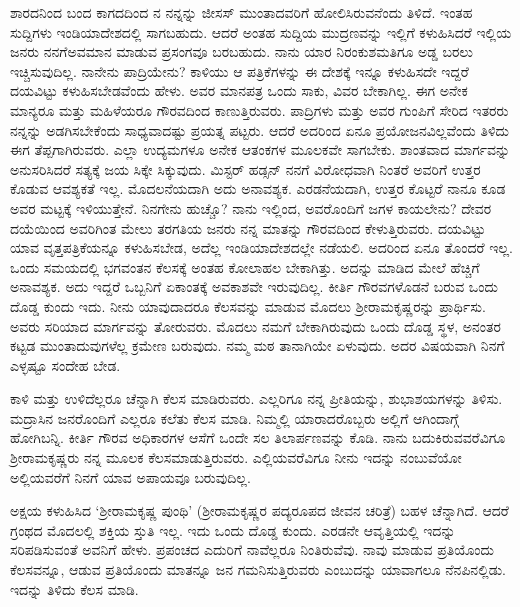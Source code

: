 ಶಾರದನಿಂದ ಬಂದ ಕಾಗದದಿಂದ ನ\enginline{-} ನನ್ನನ್ನು ಜೀಸಸ್ ಮುಂತಾದವರಿಗೆ ಹೋಲಿಸಿರುವನೆಂದು ತಿಳಿದೆ. ಇಂತಹ ಸುದ್ದಿಗಳು ಇಂಡಿಯಾದೇಶದಲ್ಲಿ ಸಾಗಬಹುದು. ಆದರೆ ಅಂತಹ ಸುದ್ದಿಯ ಮುದ್ರಣವನ್ನು ಇಲ್ಲಿಗೆ ಕಳುಹಿಸಿದರೆ ಇಲ್ಲಿಯ ಜನರು ನನಗೆ\break ಅವಮಾನ ಮಾಡುವ ಪ್ರಸಂಗವೂ ಬರಬಹುದು. ನಾನು ಯಾರ ನಿರಂಕುಶಮತಿಗೂ ಅಡ್ಡ ಬರಲು ಇಚ್ಚಿಸುವುದಿಲ್ಲ. ನಾನೇನು ಪಾದ್ರಿಯೇನು? ಕಾಳಿಯು ಆ ಪತ್ರಿಕೆಗಳನ್ನು ಈ ದೇಶಕ್ಕೆ ಇನ್ನೂ ಕಳುಹಿಸದೇ ಇದ್ದರೆ ದಯವಿಟ್ಟು ಕಳುಹಿಸಬೇಡವೆಂದು ಹೇಳು. ಅವರ ಮಾನಪತ್ರ ಒಂದು ಸಾಕು, ವಿವರ ಬೇಕಾಗಿಲ್ಲ. ಈಗ ಅನೇಕ ಮಾನ್ಯರೂ ಮತ್ತು ಮಹಿಳೆಯರೂ ಗೌರವದಿಂದ ಕಾಣುತ್ತಿರುವರು. ಪಾದ್ರಿಗಳು ಮತ್ತು ಅವರ ಗುಂಪಿಗೆ ಸೇರಿದ ಇತರರು ನನ್ನನ್ನು ಅಡಗಿಸಬೇಕೆಂದು ಸಾಧ್ಯವಾದಷ್ಟು ಪ್ರಯತ್ನ ಪಟ್ಟರು. ಆದರೆ ಅದರಿಂದ ಏನೂ ಪ್ರಯೋಜನವಿಲ್ಲವೆಂದು ತಿಳಿದು ಈಗ ತೆಪ್ಪಗಾಗಿರುವರು. ಎಲ್ಲಾ ಉದ್ಯಮಗಳೂ ಅನೇಕ ಆತಂಕಗಳ ಮೂಲಕವೇ ಸಾಗಬೇಕು. ಶಾಂತವಾದ ಮಾರ್ಗವನ್ನು ಅನುಸರಿಸಿದರೆ ಸತ್ಯಕ್ಕೆ ಜಯ ಸಿಕ್ಕೇ ಸಿಕ್ಕುವುದು. ಮಿಸ್ಟರ್ ಹಡ್ಸನ್ ನನಗೆ ವಿರೋಧವಾಗಿ ನಿಂತರೆ ಅವರಿಗೆ ಉತ್ತರ ಕೊಡುವ ಆವಶ್ಯಕತೆ ಇಲ್ಲ. ಮೊದಲನೆಯದಾಗಿ ಅದು ಅನಾವಶ್ಯಕ. ಎರಡನೆಯದಾಗಿ, ಉತ್ತರ ಕೊಟ್ಟರೆ ನಾನೂ ಕೂಡ ಅವರ ಮಟ್ಟಕ್ಕೆ ಇಳಿಯುತ್ತೇನೆ. ನಿನಗೇನು ಹುಚ್ಚೊ? ನಾನು ಇಲ್ಲಿಂದ, ಅವರೊಂದಿಗೆ ಜಗಳ ಕಾಯಲೇನು? ದೇವರ ದಯೆಯಿಂದ ಅವರಿಗಿಂತ ಮೇಲು ತರಗತಿಯ ಜನರು ನನ್ನ ಮಾತನ್ನು ಗೌರವದಿಂದ ಕೇಳುತ್ತಿರುವರು. ದಯವಿಟ್ಟು ಯಾವ ವೃತ್ತಪತ್ರಿಕೆಯನ್ನೂ ಕಳುಹಿಸಬೇಡ, ಅದೆಲ್ಲ ಇಂಡಿಯಾದೇಶದಲ್ಲೇ ನಡೆಯಲಿ. ಅದರಿಂದ ಏನೂ ತೊಂದರೆ ಇಲ್ಲ. ಒಂದು ಸಮಯದಲ್ಲಿ ಭಗವಂತನ ಕೆಲಸಕ್ಕೆ ಅಂತಹ ಕೋಲಾಹಲ ಬೇಕಾಗಿತ್ತು. ಅದನ್ನು ಮಾಡಿದ ಮೇಲೆ ಹೆಚ್ಚಿಗೆ ಅನಾವಶ್ಯಕ. ಅದು ಇದ್ದರೆ ಒಬ್ಬನಿಗೆ ಏಕಾಂತಕ್ಕೆ ಅವಕಾಶವೇ ಇರುವುದಿಲ್ಲ. ಕೀರ್ತಿ ಗೌರವಗಳೊಡನೆ ಬರುವ ಒಂದು ದೊಡ್ಡ ಕುಂದು ಇದು. ನೀನು ಯಾವುದಾದರೂ ಕೆಲಸವನ್ನು ಮಾಡುವ ಮೊದಲು ಶ‍್ರೀರಾಮಕೃಷ್ಣರನ್ನು ಪ್ರಾರ್ಥಿಸು. ಅವರು ಸರಿಯಾದ ಮಾರ್ಗವನ್ನು ತೋರುವರು. ಮೊದಲು ನಮಗೆ ಬೇಕಾಗಿರುವುದು ಒಂದು ದೊಡ್ಡ ಸ್ಥಳ, ಅನಂತರ ಕಟ್ಟಡ ಮುಂತಾದುವುಗಳೆಲ್ಲ ಕ್ರಮೇಣ ಬರುವುದು. ನಮ್ಮ ಮಠ ತಾನಾಗಿಯೇ ಏಳುವುದು. ಅದರ ವಿಷಯವಾಗಿ ನಿನಗೆ ಎಳ್ಳಷ್ಟೂ ಸಂದೇಹ ಬೇಡ.

\vspace{0.1cm}

ಕಾಳಿ ಮತ್ತು ಉಳಿದೆಲ್ಲರೂ ಚೆನ್ನಾಗಿ ಕೆಲಸ ಮಾಡಿರುವರು. ಎಲ್ಲರಿಗೂ ನನ್ನ ಪ್ರೀತಿಯನ್ನು, ಶುಭಾಶಯಗಳನ್ನು ತಿಳಿಸು. ಮದ್ರಾಸಿನ ಜನರೊಂದಿಗೆ ಎಲ್ಲರೂ ಕಲೆತು ಕೆಲಸ ಮಾಡಿ. ನಿಮ್ಮಲ್ಲಿ ಯಾರಾದರೊಬ್ಬರು ಅಲ್ಲಿಗೆ ಆಗಿಂದಾಗ್ಗೆ ಹೋಗಿಬನ್ನಿ. ಕೀರ್ತಿ ಗೌರವ ಅಧಿಕಾರಗಳ ಆಸೆಗೆ ಒಂದೇ ಸಲ ತಿಲಾರ್ಪಣವನ್ನು ಕೊಡಿ. ನಾನು ಬದುಕಿರುವವರೆವಿಗೂ ಶ‍್ರೀರಾಮಕೃಷ್ಣರು ನನ್ನ ಮೂಲಕ ಕೆಲಸಮಾಡುತ್ತಿರುವರು. ಎಲ್ಲಿಯವರೆವಿಗೂ ನೀನು ಇದನ್ನು ನಂಬುವೆಯೋ ಅಲ್ಲಿಯವರೆಗೆ ನಿನಗೆ ಯಾವ ಅಪಾಯವೂ ಬರುವುದಿಲ್ಲ.

\vspace{0.1cm}

ಅಕ್ಷಯ ಕಳುಹಿಸಿದ ‘ಶ‍್ರೀರಾಮಕೃಷ್ಣ ಪುಂಥಿ’ (ಶ‍್ರೀರಾಮಕೃಷ್ಣರ ಪದ್ಯರೂಪದ ಜೀವನ ಚರಿತ್ರೆ) ಬಹಳ ಚೆನ್ನಾಗಿದೆ. ಆದರೆ ಗ್ರಂಥದ ಮೊದಲಲ್ಲಿ ಶಕ್ತಿಯ ಸ್ತುತಿ ಇಲ್ಲ. ಇದು ಒಂದು ದೊಡ್ಡ ಕುಂದು. ಎರಡನೇ ಆವೃತ್ತಿಯಲ್ಲಿ ಇದನ್ನು ಸರಿಪಡಿಸುವಂತೆ ಅವನಿಗೆ ಹೇಳು. ಪ್ರಪಂಚದ ಎದುರಿಗೆ ನಾವೆಲ್ಲರೂ ನಿಂತಿರುವೆವು. ನಾವು ಮಾಡುವ ಪ್ರತಿಯೊಂದು ಕೆಲಸವನ್ನೂ, ಆಡುವ ಪ್ರತಿಯೊಂದು ಮಾತನ್ನೂ ಜನ ಗಮನಿಸುತ್ತಿರುವರು ಎಂಬುದನ್ನು ಯಾವಾಗಲೂ ನೆನಪಿನಲ್ಲಿಡು. ಇದನ್ನು ತಿಳಿದು ಕೆಲಸ ಮಾಡಿ.

